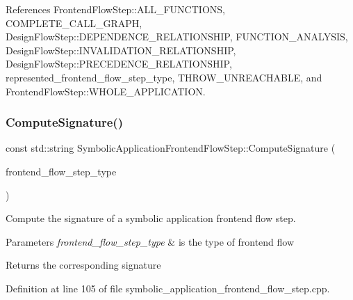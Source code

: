 References Frontend\+Flow\+Step\+::\+A\+L\+L\+\_\+\+F\+U\+N\+C\+T\+I\+O\+NS, C\+O\+M\+P\+L\+E\+T\+E\+\_\+\+C\+A\+L\+L\+\_\+\+G\+R\+A\+PH, Design\+Flow\+Step\+::\+D\+E\+P\+E\+N\+D\+E\+N\+C\+E\+\_\+\+R\+E\+L\+A\+T\+I\+O\+N\+S\+H\+IP, F\+U\+N\+C\+T\+I\+O\+N\+\_\+\+A\+N\+A\+L\+Y\+S\+IS, Design\+Flow\+Step\+::\+I\+N\+V\+A\+L\+I\+D\+A\+T\+I\+O\+N\+\_\+\+R\+E\+L\+A\+T\+I\+O\+N\+S\+H\+IP, Design\+Flow\+Step\+::\+P\+R\+E\+C\+E\+D\+E\+N\+C\+E\+\_\+\+R\+E\+L\+A\+T\+I\+O\+N\+S\+H\+IP, represented\+\_\+frontend\+\_\+flow\+\_\+step\+\_\+type, T\+H\+R\+O\+W\+\_\+\+U\+N\+R\+E\+A\+C\+H\+A\+B\+LE, and Frontend\+Flow\+Step\+::\+W\+H\+O\+L\+E\+\_\+\+A\+P\+P\+L\+I\+C\+A\+T\+I\+ON.

\mbox{\label{classSymbolicApplicationFrontendFlowStep_aedd0e776b99f86abc0f35695c0a423a3}} 
\subsubsection{\texorpdfstring{Compute\+Signature()}{ComputeSignature()}}
{\footnotesize\ttfamily const std\+::string Symbolic\+Application\+Frontend\+Flow\+Step\+::\+Compute\+Signature (\begin{DoxyParamCaption}\item[{const \hyperlink{frontend__flow__step_8hpp_afeb3716c693d2b2e4ed3e6d04c3b63bb}{Frontend\+Flow\+Step\+Type}}]{frontend\+\_\+flow\+\_\+step\+\_\+type }\end{DoxyParamCaption})\hspace{0.3cm}{\ttfamily [static]}}



Compute the signature of a symbolic application frontend flow step. 


\begin{DoxyParams}{Parameters}
{\em frontend\+\_\+flow\+\_\+step\+\_\+type} & is the type of frontend flow \\
\hline
\end{DoxyParams}
\begin{DoxyReturn}{Returns}
the corresponding signature 
\end{DoxyReturn}


Definition at line 105 of file symbolic\+\_\+application\+\_\+frontend\+\_\+flow\+\_\+step.\+cpp.




